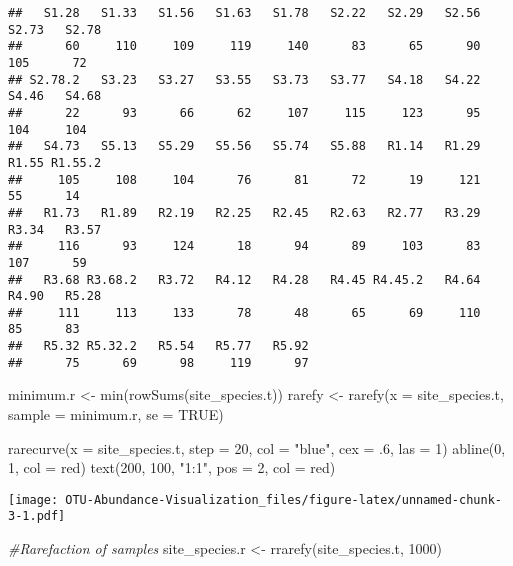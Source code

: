 \documentclass[
]{article}
\newenvironment{Shaded}{\begin{snugshade}}{\end{snugshade}}
\newcommand{\AttributeTok}[1]{\textcolor[rgb]{0.77,0.63,0.00}{#1}}
\newcommand{\CommentTok}[1]{\textcolor[rgb]{0.56,0.35,0.01}{\textit{#1}}}
\newcommand{\ConstantTok}[1]{\textcolor[rgb]{0.00,0.00,0.00}{#1}}
\newcommand{\DecValTok}[1]{\textcolor[rgb]{0.00,0.00,0.81}{#1}}
\newcommand{\FunctionTok}[1]{\textcolor[rgb]{0.00,0.00,0.00}{#1}}
\newcommand{\NormalTok}[1]{#1}
\newcommand{\OtherTok}[1]{\textcolor[rgb]{0.56,0.35,0.01}{#1}}
\newcommand{\StringTok}[1]{\textcolor[rgb]{0.31,0.60,0.02}{#1}}
\begin{document}
\begin{verbatim}
##   S1.28   S1.33   S1.56   S1.63   S1.78   S2.22   S2.29   S2.56   S2.73   S2.78 
##      60     110     109     119     140      83      65      90     105      72 
## S2.78.2   S3.23   S3.27   S3.55   S3.73   S3.77   S4.18   S4.22   S4.46   S4.68 
##      22      93      66      62     107     115     123      95     104     104 
##   S4.73   S5.13   S5.29   S5.56   S5.74   S5.88   R1.14   R1.29   R1.55 R1.55.2 
##     105     108     104      76      81      72      19     121      55      14 
##   R1.73   R1.89   R2.19   R2.25   R2.45   R2.63   R2.77   R3.29   R3.34   R3.57 
##     116      93     124      18      94      89     103      83     107      59 
##   R3.68 R3.68.2   R3.72   R4.12   R4.28   R4.45 R4.45.2   R4.64   R4.90   R5.28 
##     111     113     133      78      48      65      69     110      85      83 
##   R5.32 R5.32.2   R5.54   R5.77   R5.92 
##      75      69      98     119      97
\end{verbatim}

\begin{Shaded}
\begin{Highlighting}[]
\NormalTok{minimum.r }\OtherTok{\textless{}{-}} \FunctionTok{min}\NormalTok{(}\FunctionTok{rowSums}\NormalTok{(site\_species.t))}
\NormalTok{rarefy }\OtherTok{\textless{}{-}} \FunctionTok{rarefy}\NormalTok{(}\AttributeTok{x =}\NormalTok{ site\_species.t, }\AttributeTok{sample =}\NormalTok{ minimum.r, }\AttributeTok{se =} \ConstantTok{TRUE}\NormalTok{)}

\FunctionTok{rarecurve}\NormalTok{(}\AttributeTok{x =}\NormalTok{ site\_species.t, }\AttributeTok{step =} \DecValTok{20}\NormalTok{, }\AttributeTok{col =} \StringTok{"blue"}\NormalTok{, }\AttributeTok{cex =}\NormalTok{ .}\DecValTok{6}\NormalTok{, }\AttributeTok{las =} \DecValTok{1}\NormalTok{)}
\FunctionTok{abline}\NormalTok{(}\DecValTok{0}\NormalTok{, }\DecValTok{1}\NormalTok{, }\AttributeTok{col =} \StringTok{\textquotesingle{}red\textquotesingle{}}\NormalTok{)}
\FunctionTok{text}\NormalTok{(}\DecValTok{200}\NormalTok{, }\DecValTok{100}\NormalTok{, }\StringTok{"1:1"}\NormalTok{, }\AttributeTok{pos =} \DecValTok{2}\NormalTok{, }\AttributeTok{col =} \StringTok{\textquotesingle{}red\textquotesingle{}}\NormalTok{)}
\end{Highlighting}
\end{Shaded}

\texttt{[image: OTU-Abundance-Visualization\_files/figure-latex/unnamed-chunk-3-1.pdf]}

\begin{Shaded}
\begin{Highlighting}[]
\CommentTok{\#Rarefaction of samples}
\NormalTok{site\_species.r }\OtherTok{\textless{}{-}} \FunctionTok{rrarefy}\NormalTok{(site\_species.t, }\DecValTok{1000}\NormalTok{)}
\end{Highlighting}
\end{Shaded}
\end{document}

